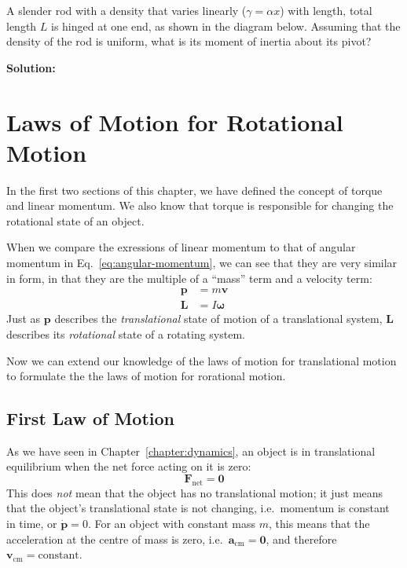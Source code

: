 \begin{example}
  A slender rod with a density that varies linearly ($\gamma=\alpha x$) with
  length, total length $L$ is hinged at one end, as shown in the diagram below.
  Assuming that the density of the rod is uniform, what is its moment of
  inertia about its pivot?
  \begin{center}
  \end{center}
  \textbf{Solution:}
\end{example}




\section{Laws of Motion for Rotational Motion}

In the first two sections of this chapter, we have defined the concept of
torque and linear momentum. We also know that torque is responsible for
changing the rotational state of an object.

When we compare the exressions of linear momentum to that of angular momentum in
Eq.~\ref{eq:angular-momentum}, we can see that they are very similar in form,
in that they are the multiple of a ``mass'' term and a velocity term:
\begin{align*}
  \bm p &= m\bm v\\
  \bm L &= I\bm\omega
\end{align*}
Just as $\bm p$ describes the \emph{translational} state of motion of a
translational system, $\bm L$ describes its \emph{rotational} state of a
rotating system.

Now we can extend our knowledge of the laws of motion for translational motion
to formulate the the laws of motion for rorational motion.



\subsection{First Law of Motion}

As we have seen in Chapter~\ref{chapter:dynamics}, an object is in
translational equilibrium when the net force acting on it is zero:
\begin{equation*}
  \bm F_\text{net}=\bm 0
\end{equation*}
This does \emph{not} mean that the object has no translational motion; it just
means that the object's translational state is not changing, i.e.\ momentum is
constant in time, or $\dot{\bm p}=0$. For an object with constant mass $m$,
this means that the acceleration at the centre of mass is zero, i.e.\
$\bm a_\text{cm}=\bm 0$, and therefore $\bm v_\text{cm}=\text{constant}$.

